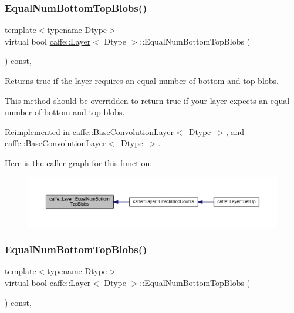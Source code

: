 \subsubsection{\texorpdfstring{Equal\+Num\+Bottom\+Top\+Blobs()}{EqualNumBottomTopBlobs()}\hspace{0.1cm}{\footnotesize\ttfamily [1/2]}}
{\footnotesize\ttfamily template$<$typename Dtype$>$ \\
virtual bool \mbox{\hyperlink{classcaffe_1_1_layer}{caffe\+::\+Layer}}$<$ Dtype $>$\+::Equal\+Num\+Bottom\+Top\+Blobs (\begin{DoxyParamCaption}{ }\end{DoxyParamCaption}) const\hspace{0.3cm}{\ttfamily [inline]}, {\ttfamily [virtual]}}



Returns true if the layer requires an equal number of bottom and top blobs. 

This method should be overridden to return true if your layer expects an equal number of bottom and top blobs. 

Reimplemented in \mbox{\hyperlink{classcaffe_1_1_base_convolution_layer_ad8e839460bf52abe3df2008b99a1810d}{caffe\+::\+Base\+Convolution\+Layer$<$ Dtype $>$}}, and \mbox{\hyperlink{classcaffe_1_1_base_convolution_layer_ad8e839460bf52abe3df2008b99a1810d}{caffe\+::\+Base\+Convolution\+Layer$<$ Dtype $>$}}.

Here is the caller graph for this function\+:
\nopagebreak
\begin{figure}[H]
\begin{center}
\leavevmode
\includegraphics[width=350pt]{classcaffe_1_1_layer_af452a938bc7596f9b5e9900c8dc4ab3d_icgraph}
\end{center}
\end{figure}
\mbox{\label{classcaffe_1_1_layer_af452a938bc7596f9b5e9900c8dc4ab3d}} 
\subsubsection{\texorpdfstring{Equal\+Num\+Bottom\+Top\+Blobs()}{EqualNumBottomTopBlobs()}\hspace{0.1cm}{\footnotesize\ttfamily [2/2]}}
{\footnotesize\ttfamily template$<$typename Dtype$>$ \\
virtual bool \mbox{\hyperlink{classcaffe_1_1_layer}{caffe\+::\+Layer}}$<$ Dtype $>$\+::Equal\+Num\+Bottom\+Top\+Blobs (\begin{DoxyParamCaption}{ }\end{DoxyParamCaption}) const\hspace{0.3cm}{\ttfamily [inline]}, {\ttfamily [virtual]}}



